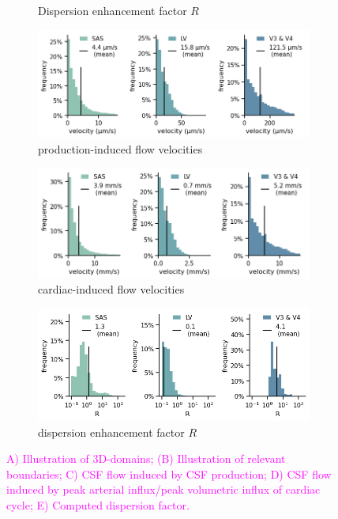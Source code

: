 \documentclass[fleqn,10pt]{wlscirep}
\newcommand{\mer}[1]{\textcolor{magenta}{#1}}
\begin{document}
\begin{figure}[h!]
\begin{subfigure}[b]{0.33\textwidth}
\caption{Dispersion enhancement factor $R$}
\label{fig:csf_flow_R}
\end{subfigure}
\begin{subfigure}[b]{0.33\textwidth}
\includegraphics[width = 1 \textwidth]{figures/prod_velocity_histo.png} 
\caption{production-induced flow velocities}
\label{fig:csf_flow_histo_prod}
\end{subfigure}
\begin{subfigure}[b]{0.33\textwidth}
\includegraphics[width = 1 \textwidth]{figures/cardiac_velocity_histo.png} 
\caption{cardiac-induced flow velocities}
\label{fig:csf_flow_histo_cardiac}
\end{subfigure}
\begin{subfigure}[b]{0.33\textwidth}
\includegraphics[width = 1 \textwidth]{figures/R_histo.png} 
\caption{dispersion enhancement factor $R$}
\label{fig:csf_flow_histo_R}
\end{subfigure}
\caption{\mer{A) Illustration of 3D-domains; (B) Illustration of
    relevant boundaries; C) CSF flow induced by CSF production; D) CSF
    flow induced by peak arterial influx/peak volumetric influx of
    cardiac cycle; E) Computed dispersion factor.}}
\label{fig:csf}
\end{figure}  
\end{document}
